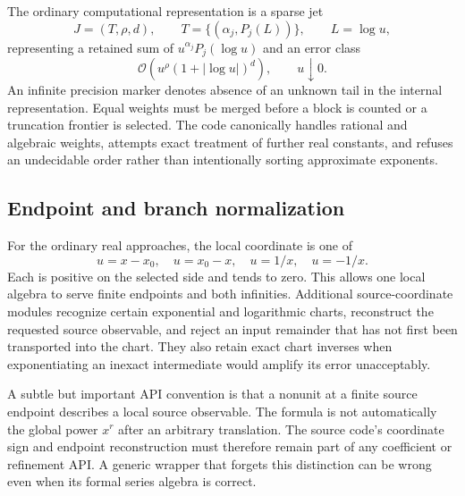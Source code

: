 \documentclass[11pt,a4paper]{article}
\newcommand{\code}[1]{\texttt{\detokenize{#1}}}
\newcommand{\OO}{\mathcal O}
\begin{document}
The ordinary computational representation is a sparse jet
\[
 J=(T,\rho,d),\qquad
 T=\{(\alpha_j,P_j(L))\},\qquad L=\log u,
\]
representing a retained sum of $u^{\alpha_j}P_j(\log u)$ and an error class
\[
 \OO\!\left(u^\rho(1+|\log u|)^d\right),\qquad u\downarrow0.
\]
An infinite precision marker denotes absence of an unknown tail in the
internal representation. Equal weights must be merged before a block is
counted or a truncation frontier is selected. The code canonically handles
rational and algebraic weights, attempts exact treatment of further real
constants, and refuses an undecidable order rather than intentionally
sorting approximate exponents.\cite{core}

\subsection{Endpoint and branch normalization}
For the ordinary real approaches, the local coordinate is one of
\[
 u=x-x_0,\quad u=x_0-x,\quad u=1/x,\quad u=-1/x.
\]
Each is positive on the selected side and tends to zero. This allows one
local algebra to serve finite endpoints and both infinities. Additional
source-coordinate modules recognize certain exponential and logarithmic
charts, reconstruct the requested source observable, and reject an input
remainder that has not first been transported into the chart. They also
retain exact chart inverses when exponentiating an inexact intermediate
would amplify its error unacceptably.\cite{core,sourcecoords}

A subtle but important API convention is that a nonunit \code{"Power"} at a
finite source endpoint describes a local source observable. The formula is
not automatically the global power $x^r$ after an arbitrary translation.
The source code's coordinate sign and endpoint reconstruction must therefore
remain part of any coefficient or refinement API. A generic wrapper that
forgets this distinction can be wrong even when its formal series algebra
is correct.\cite{core,refinement}
\end{document}
